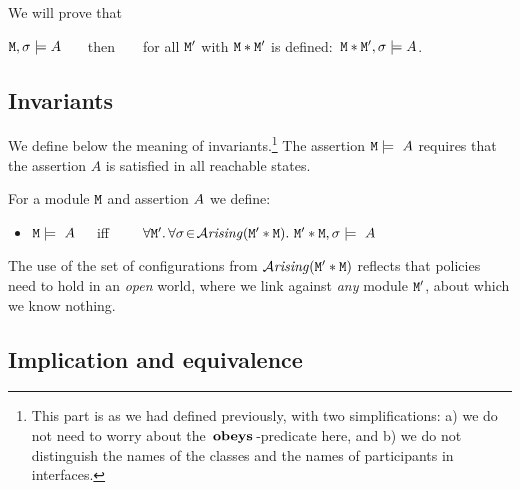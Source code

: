 \vspace{.2in}
We will prove that

\begin{lemma}

${\mbox{\tt{M}}},\sigma \models A$  \ \ \ then\ \ \ \   for all ${\mbox{\tt{M}}}'$ with ${\mbox{\tt{M}}}*{\mbox{\tt{M}}}'$ is defined:\ ${\mbox{\tt{M}}}*{\mbox{\tt{M}}}',\sigma \models A$.
\end{lemma}




\subsection{Invariants}

We define below the meaning of invariants.\footnote{This part is as we had defined previously, with two simplifications: a) we do not need to worry about the $\,\textbf{\textrm{obeys}}\,$-predicate here, and b) we do not distinguish the names of the classes and the names of participants in interfaces.}
The assertion ${\mbox{\tt{M}}}   \models\  A$ requires that  the assertion $A$ is satisfied
in all reachable states.

\begin{definition}[Invariants]
\label{def:invariant}
\noindent
For a module ${\mbox{\tt{M}}}$  and assertion $A$ we define:\\

 \begin{itemize}
 \item
${\mbox{\tt{M}}}   \models\  A$\ \ \  iff\ \ \ \
$\forall {\mbox{\tt{M}}}'.\, \forall \sigma\!\in\!{\mathcal{A}}\textrm{\textit{rising}}({\mbox{\tt{M}}}'*{\mbox{\tt{M}}}).\ {\mbox{\tt{M}}}'*{\mbox{\tt{M}}},\sigma \models \  A$
 \end{itemize}
\end{definition}

The use of the set of configurations from ${\mathcal{A}}\textrm{\textit{rising}}({\mbox{\tt{M}}}'*{\mbox{\tt{M}}})$ reflects that policies
 need to hold in an {\em open} world, where
we link against {\em any} module ${\mbox{\tt{M}}}'$,
about which we know nothing.

\subsection{Implication and equivalence}

